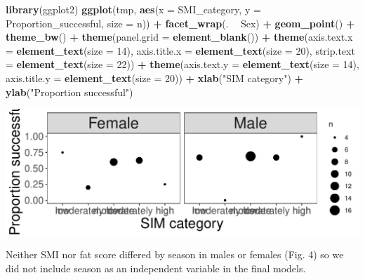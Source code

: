 \documentclass[
]{article}
\newenvironment{Shaded}{\begin{snugshade}}{\end{snugshade}}
\newcommand{\DataTypeTok}[1]{\textcolor[rgb]{0.13,0.29,0.53}{#1}}
\newcommand{\DecValTok}[1]{\textcolor[rgb]{0.00,0.00,0.81}{#1}}
\newcommand{\KeywordTok}[1]{\textcolor[rgb]{0.13,0.29,0.53}{\textbf{#1}}}
\newcommand{\NormalTok}[1]{#1}
\newcommand{\OperatorTok}[1]{\textcolor[rgb]{0.81,0.36,0.00}{\textbf{#1}}}
\newcommand{\StringTok}[1]{\textcolor[rgb]{0.31,0.60,0.02}{#1}}
\begin{document}
\begin{Shaded}
\begin{Highlighting}[]
\KeywordTok{library}\NormalTok{(ggplot2)}
\KeywordTok{ggplot}\NormalTok{(tmp, }\KeywordTok{aes}\NormalTok{(}\DataTypeTok{x =}\NormalTok{ SMI_category, }\DataTypeTok{y =}\NormalTok{ Proportion_successful, }
    \DataTypeTok{size =}\NormalTok{ n)) }\OperatorTok{+}\StringTok{ }\KeywordTok{facet_wrap}\NormalTok{(. }\OperatorTok{~}\StringTok{ }\NormalTok{Sex) }\OperatorTok{+}\StringTok{ }\KeywordTok{geom_point}\NormalTok{() }\OperatorTok{+}\StringTok{ }\KeywordTok{theme_bw}\NormalTok{() }\OperatorTok{+}\StringTok{ }
\StringTok{    }\KeywordTok{theme}\NormalTok{(}\DataTypeTok{panel.grid =} \KeywordTok{element_blank}\NormalTok{()) }\OperatorTok{+}\StringTok{ }\KeywordTok{theme}\NormalTok{(}\DataTypeTok{axis.text.x =} \KeywordTok{element_text}\NormalTok{(}\DataTypeTok{size =} \DecValTok{14}\NormalTok{), }
    \DataTypeTok{axis.title.x =} \KeywordTok{element_text}\NormalTok{(}\DataTypeTok{size =} \DecValTok{20}\NormalTok{), }\DataTypeTok{strip.text =} \KeywordTok{element_text}\NormalTok{(}\DataTypeTok{size =} \DecValTok{22}\NormalTok{)) }\OperatorTok{+}\StringTok{ }
\StringTok{    }\KeywordTok{theme}\NormalTok{(}\DataTypeTok{axis.text.y =} \KeywordTok{element_text}\NormalTok{(}\DataTypeTok{size =} \DecValTok{14}\NormalTok{), }\DataTypeTok{axis.title.y =} \KeywordTok{element_text}\NormalTok{(}\DataTypeTok{size =} \DecValTok{20}\NormalTok{)) }\OperatorTok{+}\StringTok{ }
\StringTok{    }\KeywordTok{xlab}\NormalTok{(}\StringTok{"SIM category"}\NormalTok{) }\OperatorTok{+}\StringTok{ }\KeywordTok{ylab}\NormalTok{(}\StringTok{"Proportion successful"}\NormalTok{)}
\end{Highlighting}
\end{Shaded}

\includegraphics{gcondition_files/figure-latex/p2 non-linear trend results-1.pdf}

Neither SMI nor fat score differed by season in males or females (Fig.
4) so we did not include season as an independent variable in the final
models.
\end{document}
